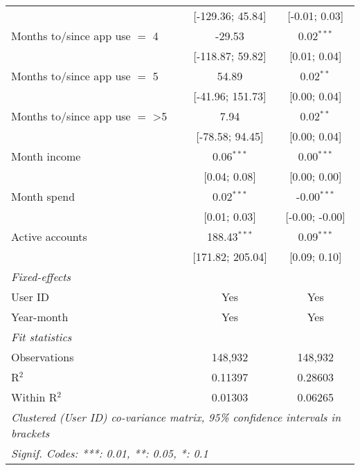 \begin{table}[htbp]
\begin{threeparttable}[b]
\begin{tabular}{lcc}
                                         & [-129.36; 45.84] & [-0.01; 0.03]\\   
         Months to/since app use $=$ 4   & -29.53           & 0.02$^{***}$\\   
                                         & [-118.87; 59.82] & [0.01; 0.04]\\   
         Months to/since app use $=$ 5   & 54.89            & 0.02$^{**}$\\   
                                         & [-41.96; 151.73] & [0.00; 0.04]\\   
         Months to/since app use $=$ >5  & 7.94             & 0.02$^{**}$\\   
                                         & [-78.58; 94.45]  & [0.00; 0.04]\\   
         Month income                    & 0.06$^{***}$     & 0.00$^{***}$\\   
                                         & [0.04; 0.08]     & [0.00; 0.00]\\   
         Month spend                     & 0.02$^{***}$     & -0.00$^{***}$\\   
                                         & [0.01; 0.03]     & [-0.00; -0.00]\\   
         Active accounts                 & 188.43$^{***}$   & 0.09$^{***}$\\   
                                         & [171.82; 205.04] & [0.09; 0.10]\\   
         \midrule
         \emph{Fixed-effects}\\
         User ID                         & Yes              & Yes\\  
         Year-month                      & Yes              & Yes\\  
         \midrule
         \emph{Fit statistics}\\
         Observations                    & 148,932          & 148,932\\  
         R$^2$                           & 0.11397          & 0.28603\\  
         Within R$^2$                    & 0.01303          & 0.06265\\  
         \midrule \midrule
         \multicolumn{3}{l}{\emph{Clustered (User ID) co-variance matrix, 95\% confidence intervals in brackets}}\\
         \multicolumn{3}{l}{\emph{Signif. Codes: ***: 0.01, **: 0.05, *: 0.1}}\\
      \end{tabular}
   \end{threeparttable}
\end{table}



